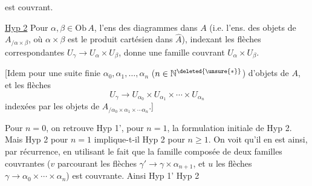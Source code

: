 
est couvrant.

\uline{Hyp 2} Pour $\alpha,\beta\in\mathrm{Ob}\,A$, l'ens des  diagrammes
\diagram{\begin{tikzcd}[ampersand replacement=\&,column sep=small,row sep=small]\&\alpha\\\gamma\arrow[ur]\arrow[dr]\&\\\&\beta\end{tikzcd}}
dans $A$ (i.e. l'ens. des objets de $A_{/\alpha\times\beta}$, où $\alpha\times\beta$ est le produit cartésien dans $\widehat A$), indexant les flèches correspondantes $U_\gamma\longrightarrow U_\alpha\times U_\beta$, donne une famille couvrant $U_\alpha\times U_\beta$.

[Idem pour une suite finie  $\alpha_0,\alpha_1,\ldots,\alpha_n$ ($n\in\mathbb N^{\deleted{\unsure{*}}}$) d'objets de $A$, et les  flèches
\[U_\gamma\longrightarrow U_{\alpha_0}\times U_{\alpha_1}\times\cdots\times U_{\alpha_n}\]
indexées par les objets de $A_{/\alpha_0\times\alpha_1\times\cdots\alpha_n}$.]

Pour $n=0$, on retrouve Hyp 1', pour $n=1$, la formulation initiale de Hyp 2. Mais Hyp 2 pour $n=1$ implique-t-il Hyp 2 pour  $n\geq1$. On voit qu'il en est ainsi, par récurrence, en utilisant le fait que la famille composée de deux familles couvrantes
($v$ parcourant les flèches $\gamma'\longrightarrow\gamma\times\alpha_{n+1}$, et $u$ les flèches $\gamma\longrightarrow\alpha_0\times\cdots\times\alpha_n$) est couvrante. Ainsi Hyp 1'  \inserted{$+$} Hyp 2

